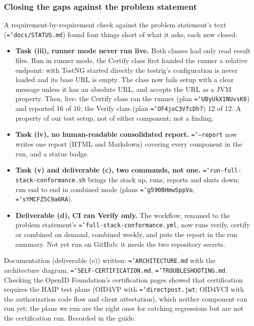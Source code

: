 \documentclass[11pt,a4paper]{article}
\newcommand{\tightlist}{\setlength{\itemsep}{0pt}\setlength{\parskip}{0pt}\setlength{\parsep}{0pt}}
\let\origtexttt\texttt
\renewcommand{\texttt}[1]{\origtexttt{\hyphenchar\font=`\-\relax #1}}
\renewcommand{\_}{\textunderscore\allowbreak}
\begin{document}
\subsubsection*{Closing the gaps against the problem statement}
A requirement-by-requirement check against the problem statement's text
(\texttt{docs/STATUS.md}) found four things short of what it asks, each now closed:
\begin{itemize}\tightlist
  \item \textbf{Task (iii), runner mode never run live.} Both classes had only read result files.
        Run in runner mode, the Certify class first handed the runner a relative endpoint: with
        TestNG started directly the testrig's configuration is never loaded and its base URL is
        empty. The class now fails setup with a clear message unless it has an absolute URL, and
        accepts the URL as a JVM property. Then, live: the Certify class ran the runner (plan
        \texttt{UByUkX1NUvsK6}) and reported 16 of 16; the Verify class (plan
        \texttt{OF4joC3VfcDh7}) 12 of 12. A property of our test setup, not of either component;
        not a finding.
  \item \textbf{Task (iv), no human-readable consolidated report.} \texttt{--report} now writes
        one report (HTML and Markdown) covering every component in the run, and a status badge.
  \item \textbf{Task (v) and deliverable (c), two commands, not one.}
        \texttt{run-full-stack-conformance.sh} brings the stack up, runs, reports and shuts down;
        run end to end in combined mode (plans \texttt{g590BHmwSppVo}, \texttt{sYMCFZ5C9a6RA}).
  \item \textbf{Deliverable (d), CI ran Verify only.} The workflow, renamed to the problem
        statement's \texttt{full-stack-conformance.yml}, now runs verify, certify or combined on
        demand, combined weekly, and puts the report in the run summary. Not yet run on GitHub: it
        needs the two repository secrets.
\end{itemize}
Documentation (deliverable (e)) written: \texttt{ARCHITECTURE.md} with the architecture diagram,
\texttt{SELF-CERTIFICATION.md}, \texttt{TROUBLESHOOTING.md}. Checking the OpenID Foundation's
certification pages showed that certification requires the HAIP test plans (OID4VP with
\texttt{direct\_post.jwt}; OID4VCI with the authorization code flow and client attestation),
which neither component can run yet; the plans we run are the right ones for catching
regressions but are not the certification run. Recorded in the guide.
\end{document}
